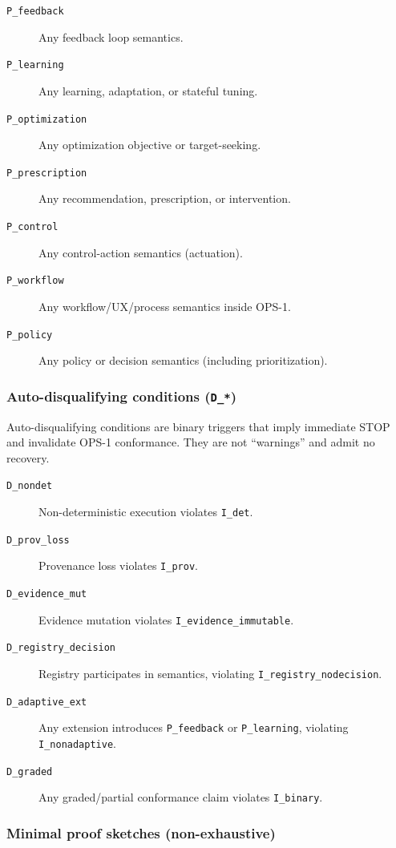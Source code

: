 \begin{description}
  \item[\texttt{P\_feedback}] Any feedback loop semantics.
  \item[\texttt{P\_learning}] Any learning, adaptation, or stateful tuning.
  \item[\texttt{P\_optimization}] Any optimization objective or target-seeking.
  \item[\texttt{P\_prescription}] Any recommendation, prescription, or intervention.
  \item[\texttt{P\_control}] Any control-action semantics (actuation).
  \item[\texttt{P\_workflow}] Any workflow/UX/process semantics inside OPS-1.
  \item[\texttt{P\_policy}] Any policy or decision semantics (including prioritization).
\end{description}

\subsubsection{Auto-disqualifying conditions (\texttt{D\_*})}

Auto-disqualifying conditions are binary triggers that imply immediate STOP and
invalidate OPS-1 conformance. They are not ``warnings'' and admit no recovery.

\begin{description}
  \item[\texttt{D\_nondet}] Non-deterministic execution violates \texttt{I\_det}.
  \item[\texttt{D\_prov\_loss}] Provenance loss violates \texttt{I\_prov}.
  \item[\texttt{D\_evidence\_mut}] Evidence mutation violates \texttt{I\_evidence\_immutable}.   
  \item[\texttt{D\_registry\_decision}] Registry participates in semantics, violating
    \texttt{I\_registry\_nodecision}.
  \item[\texttt{D\_adaptive\_ext}] Any extension introduces \texttt{P\_feedback} or
    \texttt{P\_learning}, violating \texttt{I\_nonadaptive}.
  \item[\texttt{D\_graded}] Any graded/partial conformance claim violates \texttt{I\_binary}.    
\end{description}

\subsubsection{Minimal proof sketches (non-exhaustive)}

